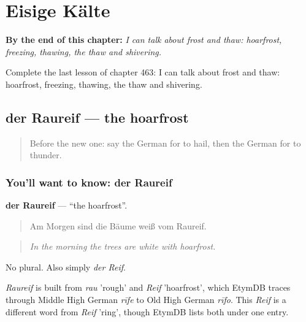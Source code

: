 
\chapter{Eisige Kälte}
\label{ch:ge-eisige-kalte}

\begin{chapteropening}
\textbf{By the end of this chapter:} \emph{I can talk about frost and thaw: hoarfrost, freezing, thawing, the thaw and shivering.}

Complete the last lesson of chapter 463: I can talk about frost and thaw: hoarfrost, freezing, thawing, the thaw and shivering.
\end{chapteropening}

\section[der Raureif]{der Raureif — the hoarfrost}

\label{lesson:GE-C463-raureif}



\begin{quote}
Before the new one: say the German for to hail, then the German for to thunder.
\end{quote}

\subsection*{You'll want to know: der Raureif}
\textbf{der Raureif} — \textquotedblleft{}the hoarfrost\textquotedblright{}.

\begin{quote}
Am Morgen sind die Bäume weiß vom Raureif.
\end{quote}

\begin{quote}
\emph{In the morning the trees are white with hoarfrost.}
\end{quote}

No plural. Also simply \emph{der Reif}.

\begin{cousinweb}
\emph{Raureif} is built from \emph{rau} 'rough' and \emph{Reif} 'hoarfrost', which EtymDB traces through Middle High German \emph{rīfe} to Old High German \emph{rīfo}. This \emph{Reif} is a different word from \emph{Reif} 'ring', though EtymDB lists both under one entry.
\end{cousinweb}

